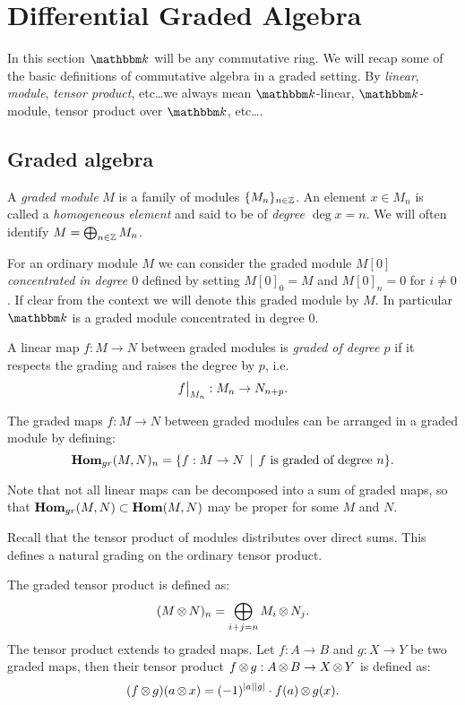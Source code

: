 
\section{Differential Graded Algebra}
\label{sec:algebra}

In this section $\k$ will be any commutative ring. We will recap some of the basic definitions of commutative algebra in a graded setting. By \emph{linear}, \emph{module}, \emph{tensor product}, etc\dots we always mean $\k$-linear, $\k$-module, tensor product over $\k$, etc\dots.

\subsection{Graded algebra}

\begin{definition}
	A \emph{graded module} $M$ is a family of modules $\{M_n\}_{n\in\mathbb{Z}}$. An element $x \in M_n$ is called a \emph{homogeneous element} and said to be of \emph{degree $\deg{x} = n$}. We will often identify $M = \bigoplus_{n \in \mathbb{Z}} M_n$.
\end{definition}

For an ordinary module $M$ we can consider the graded module $M[0]$ \emph{concentrated in degree $0$} defined by setting $M[0]_0 = M$ and $M[0]_n = 0$ for $i \neq 0$. If clear from the context we will denote this graded module by $M$. In particular $\k$ is a graded module concentrated in degree $0$.

\begin{definition}
	A linear map $f: M \to N$ between graded modules is \emph{graded of degree $p$} if it respects the grading and raises the degree by $p$, i.e.
	$$ \restr{f}{M_n} : M_n \to N_{n+p}. $$
\end{definition}

\begin{definition}
	The graded maps $f: M \to N$ between graded modules can be arranged in a graded module by defining:
	$$ \mathbf{Hom}_{gr}(M, N)_n = \{ f: M \to N \,\mid\, f \text{ is graded of degree } n \}. $$
\end{definition}

Note that not all linear maps can be decomposed into a sum of graded maps, so that $\mathbf{Hom}_{gr}(M, N) \subset \mathbf{Hom}(M, N)$ may be proper for some $M$ and $N$.

Recall that the tensor product of modules distributes over direct sums. This defines a natural grading on the ordinary tensor product.

\begin{definition}
	The graded tensor product is defined as:
	$$ (M \operatorname*{\otimes} N)_n = \bigoplus_{i + j = n} M_i \operatorname*{\otimes} N_j. $$
	The tensor product extends to graded maps. Let $f: A \to B$ and $g:X \to Y$ be two graded maps, then their tensor product $f \operatorname*{\otimes} g: A \operatorname*{\otimes} B \to X \operatorname*{\otimes} Y$ is defined as:
	$$ (f \operatorname*{\otimes} g)(a \operatorname*{\otimes} x) = (-1)^{{|{a}|}{|{g}|}} \cdot f(a) \operatorname*{\otimes} g(x). $$
\end{definition}

